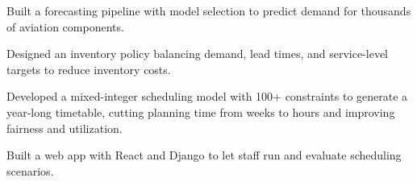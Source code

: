 \vspace{-0.2em}
\begin{zitemize}
    \item Built a forecasting pipeline with model selection to predict demand for thousands of aviation components.
    \item Designed an inventory policy balancing demand, lead times, and service-level targets to reduce inventory costs.
\end{zitemize}
\vspace{0.3em}

\vspace{-0.2em}
\begin{zitemize}
    \item Developed a mixed-integer scheduling model with 100+ constraints to generate a year-long timetable, cutting planning time from weeks to hours and improving fairness and utilization.
    \item Built a web app with React and Django to let staff run and evaluate scheduling scenarios.
\end{zitemize}
